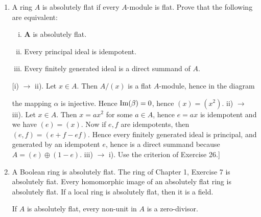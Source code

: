 \documentclass{standalone}
\theoremstyle{definition}
\theoremstyle{remark}
\begin{document}
\begin{enumerate}[resume*=exc2]
  \item A ring $A$ is absolutely flat if every $A$-module is flat. Prove that
    the following are equivalent:
    \begin{enumerate}[i)]
    \item $\boldsymbol{A}$ is absolutely flat.
    \item Every principal ideal is idempotent.
    \item Every finitely generated ideal is a direct summand of $A$.
    \end{enumerate}
[i) $\to$ ii). Let $x \in A$. Then $A /(x)$ is a flat $A$-module, hence in the
diagram
\begin{center}
\end{center}
the mapping $\alpha$ is injective. Hence $\operatorname{Im}(\beta)=0$, hence
$(x)=(x^{2})$. ii) $\to$ iii). Let $x \in A$. Then $x=a x^{2}$ for
some $a \in A$, hence $e=a x$ is idempotent and we have $(e)=(x)$. Now if $e, f$
are idempotents, then $(e, f)=(e+f-e f)$. Hence every finitely generated ideal
is principal, and generated by an idempotent $e$, hence is a direct summand
because $A=(e) \oplus(1-e)$. iii) $\to$ i). Use the criterion of Exercise 26.]

  \item A Boolean ring is absolutely flat. The ring of Chapter 1, Exercise 7 is
        absolutely fiat. Every homomorphic image of an absolutely flat ring is
        absolutely flat. If a local ring is absolutely flat, then it is a field.

        If $A$ is absolutely flat, every non-unit in $A$ is a zero-divisor.
      \end{enumerate}
\end{document}
